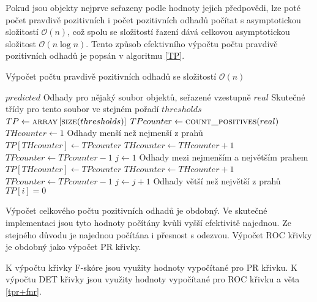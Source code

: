 Pokud jsou objekty nejprve seřazeny podle hodnoty jejich předpovědi, lze poté počet pravdivě pozitivních i počet pozitivních odhadů počítat s asymptotickou složitostí \( \mathcal O \left( n \right) \), což spolu se složitostí řazení dává celkovou asymptotickou složitost \( \mathcal O \left( n \log n \right) \). Tento způsob efektivního výpočtu počtu pravdivě pozitivních odhadů je popsán v algoritmu \ref{TP}.

\begin{algorithm}
	\caption{Výpočet počtu pravdivě pozitivních odhadů se složitostí \( \mathcal O \left( n \right) \)}
	\label{TP}
	\begin{algorithmic}
		\Require $ predicted $ \Comment Odhady pro nějaký soubor objektů, seřazené vzestupně
		\Require $ real $ \Comment Skutečné třídy pro tento soubor ve stejném pořadí
		\Require $ thresholds $
		\Statex
		\State $ TP \gets \Call{array}{} \left[ \Call{size}{thresholds} \right] $
		\State $ TPcounter \gets \Call{count\_positives}{real} $
		\State $ THcounter \gets 1 $
		 \Comment Odhady menší než nejmenší z prahů
				\Break
			\EndIf
			\State $ TP \left[ THcounter \right] \gets TPcounter $
				\State $ THcounter \gets THcounter + 1 $
		\EndFor
			\State $ TPcounter \gets TPcounter - 1 $
		\EndIf
		\State $ j \gets 1 $
		 \Comment Odhady mezi nejmenším a největším prahem
				\State $ TP \left[ THcounter \right] \gets TPcounter $
				\State $ THcounter \gets THcounter + 1 $
			\Else
					\State $ TPcounter \gets TPcounter - 1 $
				\EndIf
				\State $ j \gets j + 1 $
			\EndIf
		\EndWhile
		 \Comment Odhady větší než největší z prahů
			\State $ TP \left[ i \right] = 0 $
		\EndFor
	\end{algorithmic}
\end{algorithm}

Výpočet celkového počtu pozitivních odhadů je obdobný. Ve skutečné implementaci jsou tyto hodnoty počítány kvůli vyšší efektivitě najednou. Ze stejného důvodu je najednou počítána i přesnost s odezvou. Výpočet ROC křivky je obdobný jako výpočet PR křivky.

K výpočtu křivky F-skóre jsou využity hodnoty vypočítané pro PR křivku. K výpočtu DET křivky jsou využity hodnoty vypočítané pro ROC křivku a věta \ref{tpr+fnr}.
